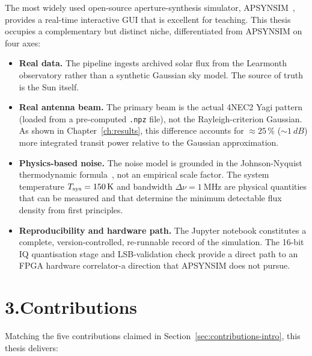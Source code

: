 The most widely used open-source aperture-synthesis simulator, \textsc{APSYNSIM}~\cite{apsynsim},
provides a real-time interactive GUI that is excellent for teaching. This thesis occupies
a complementary but distinct niche, differentiated from \textsc{APSYNSIM} on four axes:

\begin{itemize}[leftmargin=1.5em]
  \item \textbf{Real data.} The pipeline ingests archived solar flux from the Learmonth
        observatory rather than a synthetic Gaussian sky model. The source of truth is
        the Sun itself.
  \item \textbf{Real antenna beam.} The primary beam is the actual 4NEC2 Yagi pattern
        (loaded from a pre-computed \texttt{.npz} file), not the Rayleigh-criterion
        Gaussian. As shown in Chapter~\ref{ch:results}, this difference accounts for
        $\approx25\,\%$ ($\sim\!1~\si{dB}$) more integrated transit power relative to
        the Gaussian approximation.
  \item \textbf{Physics-based noise.} The noise model is grounded in the Johnson-Nyquist
        thermodynamic formula~\citep{nyquist1928}, not an empirical scale factor. The system temperature
        $T_{\rm sys}=\SI{150}{\kelvin}$ and bandwidth $\Delta\nu=\SI{1}{\mega\hertz}$
        are physical quantities that can be measured and that determine the minimum
        detectable flux density from first principles.
  \item \textbf{Reproducibility and hardware path.} The Jupyter notebook constitutes a
        complete, version-controlled, re-runnable record of the simulation. The
        16-bit IQ quantisation stage and LSB-validation check provide a direct path
        to an FPGA hardware correlator-a direction that \textsc{APSYNSIM} does not
        pursue.
\end{itemize}

\section*{3.\quad Contributions}

Matching the five contributions claimed in Section~\ref{sec:contributions-intro}, this
thesis delivers:

